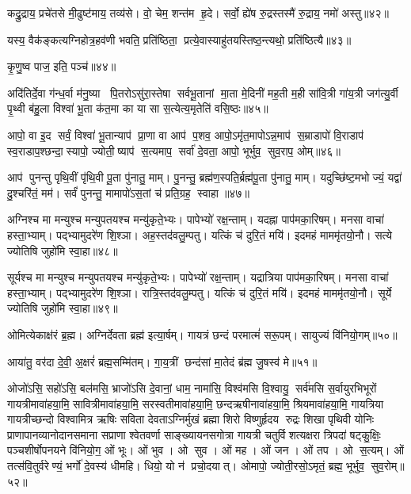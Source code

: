 कद्रु॒द्राय॒ प्रचे॑तसे मी॒ढुष्ट॑माय॒ तव्य॑से। वो॒ चेम॒ शन्त॑म हृ॒दे। सर्वो॒ ह्ये॑ष रु॒द्रस्तस्मै॑ रु॒द्राय॒ नमो॑ अस्तु॥४२॥
\anuvakamend

यस्य॒ वैक॑ङ्कत्यग्निहोत्र॒हव॑णी भवति॒ प्रति॑ष्ठिता॒ प्रत्ये॒वास्याहु॑तय\-स्तिष्ठ॒न्त्यथो॒ प्रति॑ष्ठित्यै॥४३॥
\anuvakamend


कृ॒णु॒ष्व पाज॒ इति॒ पञ्च॑॥४४॥
\anuvakamend

अदि॑तिर्दे॒वा ग॑न्ध॒र्वा म॑नु॒ष्या पि॒तरोऽसु॑रा॒स्तेषा सर्वभू॒तानां मा॒ता मे॒दिनी॑ मह॒ती म॒ही सा॑वि॒त्री गा॑य॒त्री जग॑त्यु॒र्वी पृ॒थ्वी ब॑हु॒ला विश्वा॑ भू॒ता क॑त॒मा का या सा स॒त्येत्य॒मृतेति॑ वसि॒ष्ठः॥४५॥
\anuvakamend

आपो॒ वा इ॒द सर्वं॒ विश्वा॑ भू॒तान्याप॑ प्रा॒णा वा आप॑ प॒शव॒ आपो॒ऽमृ॑त॒मापोऽन्न॒माप॑ स॒म्राडापो॑ वि॒राडाप॑ स्व॒राडाप॒श्छन्दा॒स्यापो॒ ज्योती॒ष्याप॑ स॒त्यमाप॒ सर्वा॑ दे॒वता॒ आपो॒ भूर्भुव॒ सुव॒राप॒ ओम्॥४६॥
\anuvakamend

आप॑ पुनन्तु पृथि॒वीं पृ॑थि॒वी पू॒ता पु॑नातु॒ माम्। पु॒नन्तु॒ ब्रह्म॑ण॒स्पति॒र्ब्रह्म॑पू॒ता पु॑नातु॒ माम्। यदुच्छि॑ष्ट॒मभोज्यं॒ यद्वा॑ दु॒श्चरि॑तं॒ मम॑। सर्वं॑ पुनन्तु॒ मामापो॑ऽस॒तां च॑ प्रति॒ग्रह॒ स्वाहा॥४७॥
\anuvakamend


अग्निश्च मा मन्युश्च मन्युपतयश्च मन्यु॑कृते॒भ्यः। पापेभ्यो॑ रक्ष॒न्ताम्। यदह्ना पाप॑मका॒रिषम्। मनसा वाचा॑ हस्ता॒भ्याम्। पद्भ्यामुदरे॑ण शि॒श्ञा। अह॒स्तद॑वलु॒म्पतु। यत्किं च॑ दुरि॒तं मयि॑। इदमहं माममृ॑तयो॒नौ। सत्ये ज्योतिषि जुहो॑मि स्वा॒हा॥४८॥
\anuvakamend


सूर्यश्च मा मन्युश्च मन्युपतयश्च मन्यु॑कृते॒भ्यः। पापेभ्यो॑ रक्ष॒न्ताम्। यद्रात्रिया पाप॑मका॒रिषम्। मनसा वाचा॑ हस्ता॒भ्याम्। पद्भ्यामुदरे॑ण शि॒श्ञा। रात्रि॒स्तद॑वलु॒म्पतु। यत्किं च॑ दुरि॒तं मयि॑। इदमहं माममृ॑तयो॒नौ। सूर्ये ज्योतिषि जुहो॑मि स्वा॒हा॥४९॥
\anuvakamend

ओमित्येकाक्ष॑रं ब्र॒ह्म। अग्निर्देवता ब्रह्म॑ इत्या॒र्\mbox{}षम्। गायत्रं छन्दं परमात्मं॑ सरू॒पम्। सायुज्यं वि॑नियो॒गम्॥५०॥
\anuvakamend

आया॑तु॒ वर॑दा दे॒वी॒ अ॒क्षरं॑ ब्रह्म॒सम्मि॑तम्। गा॒य॒त्रीं छन्द॑सां मा॒तेदं ब्र॑ह्म जु॒षस्व॑ मे॥५१॥ 
\anuvakamend

ओजो॑ऽसि॒ सहो॑ऽसि॒ बल॑मसि॒ भ्राजो॑ऽसि दे॒वानां॒ धाम॒ नामा॑सि॒ विश्व॑मसि वि॒श्वायु॒ सर्व॑मसि स॒र्वायुरभिभूरों गायत्रीमावा॑हया॒मि॒ सावित्रीमावा॑हया॒मि॒ सरस्वतीमावा॑ह\-या॒मि॒ छन्दऋषीनावा॑हया॒मि॒ श्रियमावा॑हया॒मि॒ गायत्रिया गायत्रीच्छन्दो विश्वामित्र ऋषिः सविता देवताऽग्निर्मुखं ब्रह्मा शिरो विष्णुर्\mbox{}हृदय रुद्रः शिखा पृथिवी योनिः प्राणापानव्यानोदानसमाना सप्राणा श्वेतवर्णा साङ्ख्यायनसगोत्रा गायत्री चतुर्विशत्यक्षरा त्रिपदा॑ षट्कु॒क्षिः॒ पञ्चशीर्\mbox{}षोपनयने वि॑नियो॒ग॒ ओं भूः। ओं भुव। ओ सुव। ओं मह। ओं जन। ओं तप। ओ स॒त्यम्। ओं तत्स॑वि॒तुर्वरेण्यं॒ भर्गो॑ दे॒वस्य॑ धीमहि। धियो॒ यो न॑ प्रचो॒दयात्। ओमापो॒ ज्योती॒रसो॒ऽमृतं॒ ब्रह्म॒ भूर्भुव॒ सुव॒रोम्॥५२॥
\anuvakamend


